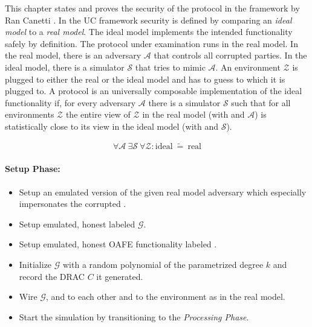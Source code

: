 \label{sec:security}

This chapter states and proves the security of the protocol in the
 framework by Ran Canetti \cite{canetti05}.
In the UC framework security is defined by comparing an \emph{ideal model} to a
\emph{real model}. The ideal model implements the intended functionality
\JWfuncSym{}{} safely by definition. The protocol under examination runs in the
real model. In the real model, there is an adversary $\mathcal{A}$ that controls
all corrupted parties.  In the ideal model, there is a simulator $\mathcal{S}$
that tries to mimic $\mathcal{A}$. An environment $\mathcal{Z}$ is plugged to
either the real or the ideal model and has to guess to which it is plugged to. A
protocol \JWprotoSym{}{} is an universally composable implementation of the
ideal functionality if, for every adversary $\mathcal{A}$ there is a
simulator $\mathcal{S}$ such that for all environments $\mathcal{Z}$ the entire
view of $\mathcal{Z}$ in the real model (with \JWprotoSym{}{} and $\mathcal{A}$)
is statistically close to its view in the ideal model (with \JWfuncSym{}{} and
$\mathcal{S}$).

\begin{align*}
%
\forall \mathcal{A}\ \exists \mathcal{S}\ \forall \mathcal{Z} :
\text{ideal}\ \widetilde{=}\ \text{real}
%
\end{align*}

%
%
\label{sec:simulators}


\label{sec:simulator-david}

\paragraph{Setup Phase:}

\begin{itemize}

  \item Setup an emulated version of the given real model adversary
    \JWadv{} which especially impersonates the corrupted \JWpTwo{}.

  \item Setup emulated, honest \JWpOne{} labeled $\mathcal{G}$.

  \item Setup emulated, honest OAFE functionality labeled \JWfuncSymOAFE{}.

  \item Initialize $\mathcal{G}$ with a random polynomial of the parametrized
    degree $k$ and record the DRAC $C$ it generated.

  \item Wire $\mathcal{G}$, \JWfuncSymOAFE{} and \JWadv{} to each other
    and \JWadv{} to the environment as in the real model.

  \item Start the simulation by transitioning to the \emph{Processing Phase}.

\end{itemize}

